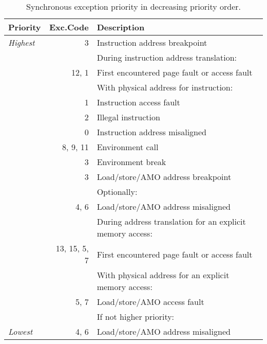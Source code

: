 \begin{table*}[htbp]
\begin{center}
\begin{tabular}{|l|r|l|}

  \hline
  Priority      & Exc.\@ Code & Description \\
  \hline
  {\em Highest} &          3 & Instruction address breakpoint \\
  \hline
                &            & During instruction address translation: \\
                &      12, 1 & \quad First encountered page fault or
                                 access fault \\
  \hline
                &            & With physical address for instruction: \\
                &          1 & \quad Instruction access fault \\
  \hline
                &          2 & Illegal instruction \\
                &          0 & Instruction address misaligned \\
                &   8, 9, 11 & Environment call \\
                &          3 & Environment break \\
                &          3 & Load/store/AMO address breakpoint \\
  \hline
                &            & Optionally: \\
                &       4, 6 & \quad Load/store/AMO address misaligned \\
  \hline
                &            & During address translation for an explicit
                                 memory access: \\
              & 13, 15, 5, 7 & \quad First encountered page fault or
                                 access fault \\
  \hline
                &            & With physical address for an explicit
                                 memory access: \\
                &       5, 7 & \quad Load/store/AMO access fault \\
  \hline
                &            & If not higher priority: \\
  {\em Lowest}  &       4, 6 & \quad Load/store/AMO address misaligned \\
  \hline

\end{tabular}
\end{center}
\caption{Synchronous exception priority in decreasing priority order.}
\label{exception-priority}
\end{table*}

